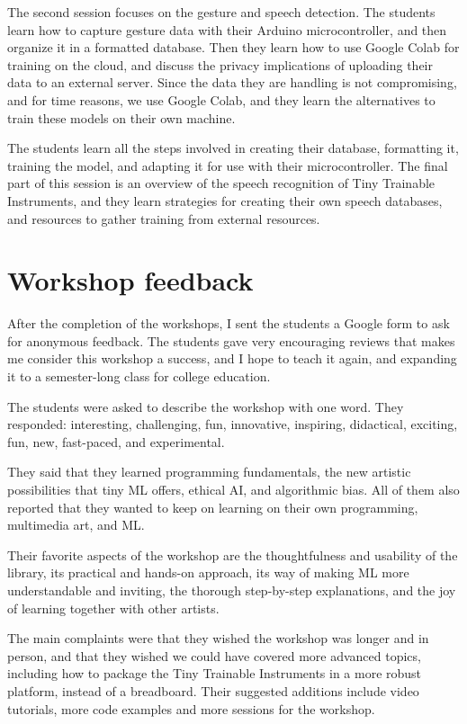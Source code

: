 The second session focuses on the gesture and speech detection. The students learn how to capture gesture data with their Arduino microcontroller, and then organize it in a formatted database. Then they learn how to use Google Colab for training on the cloud, and discuss the privacy implications of uploading their data to an external server. Since the data they are handling is not compromising, and for time reasons, we use Google Colab, and they learn the alternatives to train these models on their own machine.

The students learn all the steps involved in creating their database, formatting it, training the model, and adapting it for use with their microcontroller. The final part of this session is an overview of the speech recognition of Tiny Trainable Instruments, and they learn strategies for creating their own speech databases, and resources to gather training from external resources.

\section{Workshop feedback}

After the completion of the workshops, I sent the students a Google form to ask for anonymous feedback. The students gave very encouraging reviews that makes me consider this workshop a success, and I hope to teach it again, and expanding it to a semester-long class for college education. 

The students were asked to describe the workshop with one word. They responded: interesting, challenging, fun, innovative, inspiring, didactical, exciting, fun, new, fast-paced, and experimental.

They said that they learned programming fundamentals, the new artistic possibilities that tiny \acrshort{ML} offers, ethical \acrshort{AI}, and algorithmic bias. All of them also reported that they wanted to keep on learning on their own programming, multimedia art, and \acrshort{ML}.

Their favorite aspects of the workshop are the thoughtfulness and usability of the library, its practical and hands-on approach, its way of making \acrshort{ML} more understandable and inviting, the thorough step-by-step explanations, and the joy of learning together with other artists.

The main complaints were that they wished the workshop was longer and in person, and that they wished we could have covered more advanced topics, including how to package the Tiny Trainable Instruments in a more robust platform, instead of a breadboard. Their suggested additions include video tutorials, more code examples and more sessions for the workshop.

